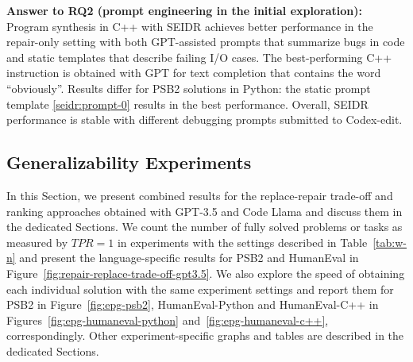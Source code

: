 \begin{framed}
\textbf{Answer to RQ2 (prompt engineering in the initial exploration):} 
Program synthesis in C++ with SEIDR achieves better performance in the repair-only setting with both GPT-assisted prompts that summarize bugs in code and static templates that describe failing I/O cases. 
The best-performing C++ instruction is obtained with GPT for text completion that contains the word ``obviously''.
Results differ for PSB2 solutions in Python: the static prompt template \ref{seidr:prompt-0} results in the best performance. 
Overall, SEIDR performance is stable with different debugging prompts submitted to Codex-edit.
\end{framed}


\newpage \subsection{Generalizability Experiments}

In this Section, we present combined results for the replace-repair trade-off and ranking approaches obtained with GPT-3.5 and Code Llama and discuss them in the dedicated Sections. 
We count the number of fully solved problems or tasks as measured by $TPR=1$ in experiments with the settings described in Table~\ref{tab:w-n} and present the language-specific results for PSB2 and HumanEval in Figure~\ref{fig:repair-replace-trade-off-gpt3.5}. 
We also explore the speed of obtaining each individual solution with the same experiment settings and report them for PSB2 in Figure~\ref{fig:epg-psb2}, HumanEval-Python and HumanEval-C++ in Figures~\ref{fig:epg-humaneval-python} and~\ref{fig:epg-humaneval-c++}, correspondingly.
Other experiment-specific graphs and tables are described in the dedicated Sections. 



